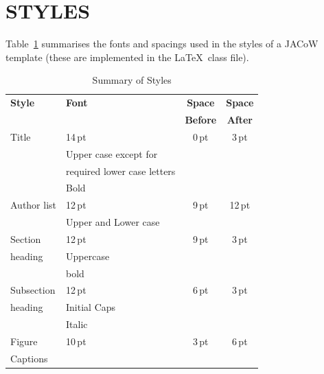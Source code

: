 \documentclass{JAC2003}
\begin{document}
\section{STYLES}

Table~\ref{style-tab} summarises the fonts and spacings used in the styles of
a JACoW template (these are implemented in the \LaTeX\ class file).

\begin{table}
    \setlength\tabcolsep{4pt}
    \caption{Summary of Styles}
    \label{style-tab}
    \begin{tabular}{llcc}
        \toprule
        \textbf{Style} & \textbf{Font}               & \textbf{Space}  & \textbf{Space} \\
                       &                             & \textbf{Before} & \textbf{After} \\ 
        \midrule
         Title         & 14\,pt                      & 0\,pt           & 3\,pt  \\
                       & Upper case except for       &                 &      \\
                       & required lower case letters &                 &      \\   %
                       & Bold                        &                 &      \\ 
         \midrule
          Author list  & 12\,pt                      & 9\,pt           & 12\,pt \\
                       & Upper and Lower case        &                 &      \\ 
         \midrule
         Section       & 12\,pt                      & 9\,pt           & 3\,pt  \\
         heading       & Uppercase                   &                 &      \\
                       & bold                        &                 &      \\ 
        \midrule
         Subsection    & 12\,pt                      & 6\,pt           & 3\,pt  \\
         heading       & Initial Caps                &                 &      \\
                       & Italic                      &                 &      \\ 
        \midrule
         Figure        & 10\,pt                      & 3\,pt           & 6\,pt  \\
         Captions      &                             &                 &      \\

\end{tabular}
\end{table}
\end{document}
